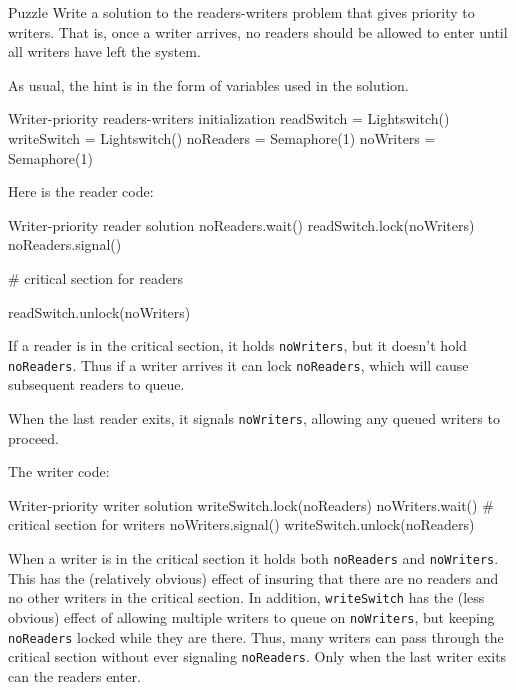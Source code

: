 \begin{puzzlebox}{Puzzle}
Write a solution to the readers-writers problem that gives
priority to writers.  That is, once a writer arrives, no readers
should be allowed to enter until all writers have left the system.



As usual, the hint is in the form of variables
used in the solution.

\begin{lstbox}{Writer-priority readers-writers initialization}
readSwitch = Lightswitch()
writeSwitch = Lightswitch()
noReaders = Semaphore(1)
noWriters = Semaphore(1)
\end{lstbox}
\end{puzzlebox}



Here is the reader code:

\begin{lstbox}{Writer-priority reader solution}
noReaders.wait()
    readSwitch.lock(noWriters)
noReaders.signal()

    # critical section for readers

readSwitch.unlock(noWriters)
\end{lstbox}

If a reader is in the critical section, it holds
{\tt noWriters}, but it doesn't hold {\tt noReaders}.
Thus if a writer arrives it can lock {\tt noReaders},
which will cause subsequent readers to queue.

When the last reader exits, it signals {\tt noWriters},
allowing any queued writers to proceed.

The writer code:

\begin{lstbox}{Writer-priority writer solution}
writeSwitch.lock(noReaders)
    noWriters.wait()
        # critical section for writers
    noWriters.signal()
writeSwitch.unlock(noReaders)
\end{lstbox}

When a writer is in the critical section it holds both
{\tt noReaders} and {\tt noWriters}.  This has the
(relatively obvious) effect of insuring that there are
no readers and no other writers in the critical section.
In addition, {\tt writeSwitch} has the (less obvious) effect of
allowing multiple writers to queue on {\tt noWriters},
but keeping {\tt noReaders} locked while they are
there.  Thus, many writers can pass through the critical
section without ever signaling
{\tt noReaders}.  Only when the last writer exits can
the readers enter.

